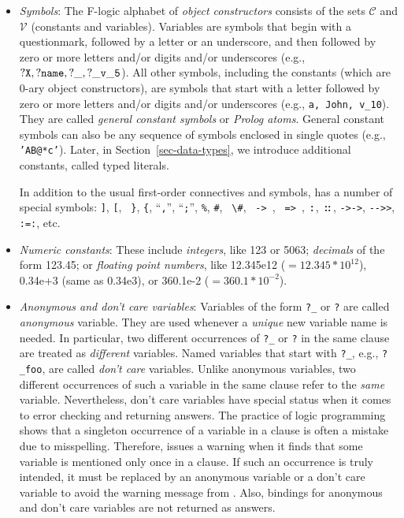 \documentclass[11pt]{article}
\newcommand{\ERGO}{\mbox{\smaller{\ensuremath{\cal{E}}\smaller{{\sc{RGO}}}}}\xspace}
\newcommand{\FLSYSTEM}{\ERGO}
\newcommand{\isa}{\,{\bf{:}}\,}
\newcommand{\subcl}{\,{\bf{::}}\,}
\newcommand{\mvd}{{\mbox{\tt \,->\,}}}  %
\newcommand{\Mvd}{{\mbox{\tt \,=>\,}}}  %
\newcommand{\bs}{\textbackslash}
\newcommand{\fl}{\mbox{F-logic}\xspace}
\newcommand{\consts}{\ensuremath{\mathcal{C}}\xspace}
\newcommand{\vars}{\ensuremath{\mathcal{V}}\xspace}
\begin{document}
\begin{itemize}
\item \emph{Symbols}: The \fl alphabet of \emph{object constructors}
  consists of the sets \consts
  and \vars
  (constants and variables).  Variables are symbols that begin with a questionmark,
  followed by a letter or an underscore, and then followed by zero or more letters and/or digits and/or
  underscores (e.g., $\tt ?X, ?name, ?\_, ?\_v\_5$).  All other symbols,
  including the constants (which are 0-ary object constructors), are
  symbols that start with a letter followed by zero or more letters and/or digits and/or
  underscores (e.g., {\tt a, John, v\_10}). They are called
  \emph{general constant symbols} or \emph{Prolog atoms}.  
  General constant symbols can also be any sequence of symbols enclosed in single quotes
  (e.g., {\tt 'AB@*c'}).
  Later, in Section~\ref{sec-data-types}, we introduce additional constants,
  called typed literals.
  
  In addition to the usual first-order connectives
  and symbols, \FLSYSTEM has a number of special symbols: {\tt ]}, {\tt [}, {\tt
    \}}, {\tt \{}, ``{\tt ,}'', ``{\tt ;}'', {\tt \%}, {\tt \#}, {\tt
    \bs{}\#}, \mvd,
  \Mvd, \isa, \subcl, {\tt ->->}, \texttt{-{}->{}>},  {\tt :=:}, etc.

\item \emph{Numeric constants}: These include \emph{integers}, like 123 or
  5063; \emph{decimals} of the form 123.45; or \emph{floating point
    numbers}, like 12.345e12 ($= 12.345*10^{12}$), 0.34e+3 (same as
  0.34e3), or 360.1e-2 ($= 360.1*10^{-2}$).
  
\item \emph{Anonymous and don't care variables}: Variables  of the form
  {\tt ?\_} or {\tt ?} are called \emph{anonymous}
  variable. They are used whenever a \emph{unique} new variable name
  is needed.  In
  particular, two different occurrences of {\tt ?\_} or {\tt ?} in the same clause are
  treated as \emph{different} variables. Named variables that start with
  \texttt{?\_}, e.g., {\tt ?\_foo}, are called \emph{don't care} variables.
  Unlike anonymous variables, two different occurrences of such a variable
  in the same clause refer to the \emph{same} variable. Nevertheless, don't
  care variables have special status when it comes to error checking
  and returning answers.  The practice of logic programming shows that a
  singleton occurrence of a variable in a clause is often a mistake due to
  misspelling. Therefore, \FLSYSTEM issues a warning when it finds that some
  variable is mentioned only once in a clause. If such an occurrence is
  truly intended, it must be replaced by an anonymous variable or a don't
  care variable to avoid the warning message from \FLSYSTEM. Also, bindings
  for anonymous and don't care variables are not returned as answers.


\end{itemize}
\end{document}
